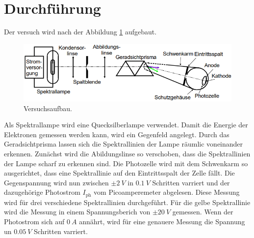 \section{Durchführung}
\label{sec:Durchführung}

Der versuch wird nach der Abbildung \ref{fig:Aufbau} aufgebaut.
\begin{figure}[H]
    \centering
    \includegraphics[scale=0.5]{content/Aufbau.png}
    \caption{Versuchsaufbau.\cite{sample}}
    \label{fig:Aufbau}
\end{figure}
Als Spektrallampe wird eine Quecksilberlampe verwendet.
Damit die Energie der Elektronen gemessen werden kann, wird ein Gegenfeld angelegt.
Durch das Geradsichtprisma lassen sich die Spektrallinien der Lampe räumlic voneinander erkennen.
Zunächst wird die Abildungslinse so verschoben, dass die Spektrallinien der Lampe scharf zu erkennen sind.
Die Photozelle wird mit dem Schwenkarm so ausgerichtet, dass eine Spektrallinie auf den Eintrittsspalt der Zelle fällt.
Die Gegenspannung wird nun zwischen $\pm \qty{2}{V}$ in $\qty{0.1}{V}$ Schritten varriert und der dazugehörige Photostrom $I_\text{ph}$ vom Picoamperemeter abgelesen. 
Diese Messung wird für drei verschiedene Spektrallinien durchgeführt.
Für die gelbe Spektrallinie wird die Messung in einem Spannungsberich von $\pm \qty{20}{V}$ gemessen.
Wenn der Photostrom sich auf $\qty{0}{A}$ annährt, wird für eine genauere Messung die Spannung un $\qty{0.05}{V}$ Schritten varriert.